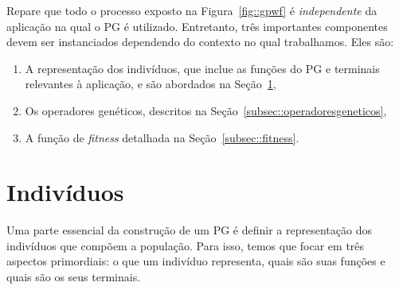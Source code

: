 
Repare que todo o processo exposto na Figura~\ref{fig::gpwf} é \textit{independente} da aplicação na qual o \textsc{PG} é utilizado. 
Entretanto, três importantes componentes devem ser instanciados dependendo do contexto no qual trabalhamos. Eles são:
\begin{enumerate}
\item A representação dos indivíduos, que inclue as funções do \textsc{PG} e terminais relevantes à aplicação, e são abordados na Seção~\ref{subsec::individuos}, 
\item Os operadores genéticos, descritos na Seção~\ref{subsec::operadoresgeneticos},
\item A função de \textit{fitness} detalhada na Seção~\ref{subsec::fitness}.
\end{enumerate}

\section{Indivíduos}
\label{subsec::individuos}

Uma parte essencial da construção de um \textsc{PG} é definir a representação dos indivíduos que compõem a população.
Para isso, temos que focar em três aspectos primordiais: o que um indivíduo representa, quais são suas funções e quais são os seus terminais. 
 
